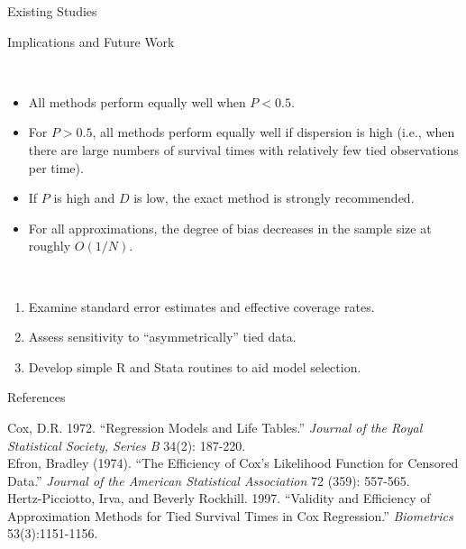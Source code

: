 \documentclass[structurebold,final,hyperref=pdftex,bookmarks,colorlinks,breaklinks]{beamer}
\begin{document}
\begin{frame}
\begin{columns}[t]
\begin{column}{0.24\linewidth}
\begin{block}{Existing Studies}
      \end{block}

      \begin{block}{Implications and Future Work}

       \\

      \begin{itemize}
      \item All methods perform equally well when $P < 0.5$.
      \item For $P > 0.5$, all methods perform equally well if dispersion is high (i.e., when there are large numbers of survival times with relatively few tied observations per time).
      \item If $P$ is high and $D$ is low, the exact method is strongly recommended.
      \item For all approximations, the degree of bias decreases in the sample size at roughly $O(1/N)$.
      \end{itemize}

       \\

      \begin{enumerate}
      \item Examine standard error estimates and effective coverage rates.
      \item Assess sensitivity to ``asymmetrically'' tied data.
      \item Develop simple R and Stata routines to aid model selection.
      \end{enumerate}

      \end{block}

      \begin{block}{References}

      \noindent Cox, D.R.  1972.  ``Regression Models and Life Tables.''  \emph{Journal of the Royal Statistical Society, Series B} 34(2): 187-220. \\

       \noindent Efron, Bradley (1974). ``The Efficiency of Cox's Likelihood Function for Censored Data.'' \emph{Journal of the American Statistical Association} 72 (359): 557-565. \\

       \noindent Hertz-Picciotto, Irva, and Beverly Rockhill.  1997. ``Validity and Efficiency of Approximation Methods for Tied Survival Times in Cox Regression.''  \emph{Biometrics} 53(3):1151-1156.

       \end{block}

    \end{column}%

  \end{columns}
\end{frame}
\end{document}
